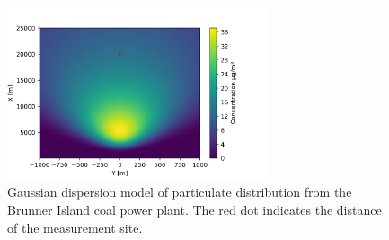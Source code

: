 \documentclass[11pt,journal]{IEEEtran}
\begin{document}
\begin{figure}[htbp]
\centering
\includegraphics[width=3in]{figs/coal_cloud}
\caption{Gaussian dispersion model of particulate distribution from the Brunner Island coal power plant. The red dot indicates the distance of the measurement site.}
\label{powerplant}
\end{figure}


%
%









\end{document}
